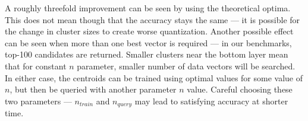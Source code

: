 A roughly threefold improvement can be seen by using the theoretical optima.
This does not mean though that the accuracy stays the same --- it is possible
for the change in cluster sizes to create worse quantization. Another
possible effect can be seen when more than one best vector is required ---
in our benchmarks, top-100 candidates are returned. Smaller clusters near
the bottom layer mean that for constant $n$ parameter, smaller number of
data vectors will be searched.
In either case, the centroids can
be trained using optimal values for some value of $n$, but then be queried
with another parameter $n$ value. Careful choosing these two parameters ---
$n_{train}$ and $n_{query}$ may lead to satisfying accuracy at shorter time.
